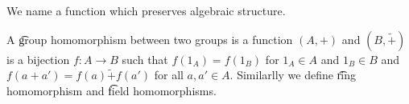 

We name a function which preserves algebraic structure.


A \t{group homomorphism} between two groups is a function
$(A, +)$ and
$(B, \tilde{+})$
is a bijection $f: A \to B$ such that
$f(1_A) = f(1_B)$ for  $1_A \in A$
and $1_B \in B$ and $f(a + a') = f(a) \tilde{+} f(a')$
for all $a, a' \in A$.
Similarlly we define \t{ring homomorphism} and \t{field homomorphisms}.

\blankpage
